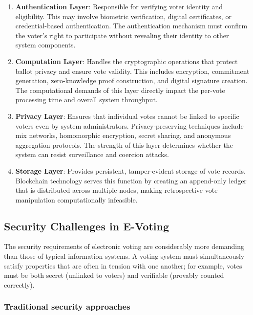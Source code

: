 \begin{enumerate}
    \item \textbf{Authentication Layer}: Responsible for verifying voter identity and eligibility. This may involve biometric verification, digital certificates, or credential-based authentication. The authentication mechanism must confirm the voter's right to participate without revealing their identity to other system components.
    
    \item \textbf{Computation Layer}: Handles the cryptographic operations that protect ballot privacy and ensure vote validity. This includes encryption, commitment generation, zero-knowledge proof construction, and digital signature creation. The computational demands of this layer directly impact the per-vote processing time and overall system throughput.
    
    \item \textbf{Privacy Layer}: Ensures that individual votes cannot be linked to specific voters even by system administrators. Privacy-preserving techniques include mix networks, homomorphic encryption, secret sharing, and anonymous aggregation protocols. The strength of this layer determines whether the system can resist surveillance and coercion attacks.
    
    \item \textbf{Storage Layer}: Provides persistent, tamper-evident storage of vote records. Blockchain technology serves this function by creating an append-only ledger that is distributed across multiple nodes, making retrospective vote manipulation computationally infeasible.
\end{enumerate}

\subsection{Security Challenges in E-Voting}
\label{subsec:security-challenges}

The security requirements of electronic voting are considerably more demanding than those of typical information systems. A voting system must simultaneously satisfy properties that are often in tension with one another; for example, votes must be both secret (unlinked to voters) and verifiable (provably counted correctly).

\subsubsection{Traditional security approaches}
\label{subsubsec:traditional-security}

